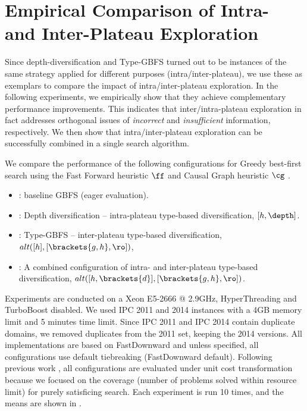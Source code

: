 \section{Empirical Comparison of Intra- and Inter-Plateau Exploration}
\label{sec:gbfs-comparison}


Since depth-diversification and Type-GBFS turned out to be instances of the same strategy applied for different purposes
(intra/inter-plateau), we use these as exemplars to compare the impact of intra/inter-plateau exploration.
In the following experiments, we empirically show that they achieve complementary performance improvements.
This indicates that inter/intra-plateau exploration in fact addresses orthogonal issues of \emph{incorrect} and \emph{insufficient} information, respectively.
We then show that intra/inter-plateau exploration can be successfully combined in a single search algorithm.

We compare the performance of the following configurations for Greedy best-first search using the Fast Forward heuristic $\ff$ \cite{hoffmann01} and Causal Graph heuristic $\cg$ \cite{Helmert04}.
\begin{itemize}
\item {}: baseline GBFS (eager evaluation).
\item {}: Depth diversification \cite{Asai2016} -- intra-plateau type-based diversification, $[h,\depth]$.
\item {}: Type-GBFS \cite{xie14type} -- inter-plateau type-based diversification,  $alt([h],[\brackets{g,h},\ro])$,
\item  {}: A combined configuration of intra- and inter-plateau type-based diversification, $alt([h,\brackets{d}],[\brackets{g,h},\ro])$.
\end{itemize}

Experiments are conducted on a Xeon E5-2666 @ 2.9GHz, HyperThreading and TurboBoost disabled.
We used IPC 2011 and 2014 instances with a 4GB memory limit and 5 minutes time limit. Since IPC 2011 and IPC 2014 contain duplicate domains, we removed duplicates from the 2011 set, keeping the 2014 versions.
All implementations are based on FastDownward \cite{Helmert2006} and
unless specified, all configurations use \fifo default tiebreaking (FastDownward default).
% 
Following previous work \cite{valenzano2014comparison,xie14type}, all configurations are evaluated under unit cost transformation
because we focused on the coverage (number of problems solved within resource limit) for purely satisficing search. 
Each experiment is run 10 times, and the means are shown in .

